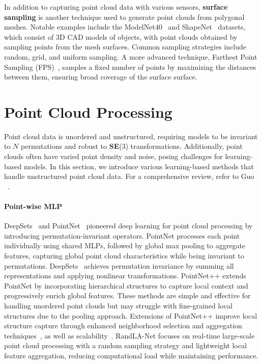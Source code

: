 In addition to capturing point cloud data with various sensors, \textbf{surface sampling} is another technique used to generate point clouds from polygonal meshes. Notable examples include the ModelNet40~\cite{wu2015ModelNet} and ShapeNet~\cite{chang2015shapenet} datasets, which consist of 3D CAD models of objects, with point clouds obtained by sampling points from the mesh surfaces. Common sampling strategies include random, grid, and uniform sampling. A more advanced technique, Farthest Point Sampling (FPS)~\cite{qi2017pointnet++}, samples a fixed number of points by maximizing the distances between them, ensuring broad coverage of the surface surface.

\section{Point Cloud Processing}
\label{sec:bg_pc_process}
Point cloud data is unordered and unstructured, requiring models to be invariant to $N\!$ permutations and robust to \textbf{SE}(3) transformations. Additionally, point clouds often have varied point density and noise, posing challenges for learning-based models. In this section, we introduce various learning-based methods that handle unstructured point cloud data. For a comprehensive review, refer to Guo \etal~\cite{guo2020deep}.

\paragraph{Point-wise MLP}
DeepSets~\cite{zaheer2017deep} and PointNet~\cite{qi2017pointnet} pioneered deep learning for point cloud processing by introducing permutation-invariant operators. PointNet processes each point individually using shared MLPs, followed by global max pooling to aggregate features, capturing global point cloud characteristics while being invariant to permutations. DeepSets~\cite{zaheer2017deep} achieves permutation invariance by summing all representations and applying nonlinear transformations. PointNet++\cite{qi2017pointnet++} extends PointNet by incorporating hierarchical structures to capture local context and progressively enrich global features. These methods are simple and effective for handling unordered point clouds but may struggle with fine-grained local structures due to the pooling approach. Extensions of PointNet++ improve local structure capture through enhanced neighborhood selection and aggregation techniques~\cite{wang2019dynamic}, as well as scalability~\cite{NEURIPS2022_9318763d}. RandLA-Net\cite{hu2020randla} focuses on real-time large-scale point cloud processing with a random sampling strategy and lightweight local feature aggregation, reducing computational load while maintaining performance.

